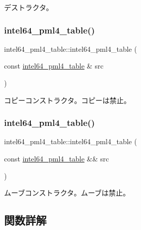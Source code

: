 デストラクタ。 \hypertarget{classintel64__pml4__table_aa6ec87ce70b16782b7aefa3e644bc7d5}{}\label{classintel64__pml4__table_aa6ec87ce70b16782b7aefa3e644bc7d5} 
\subsubsection{\texorpdfstring{intel64\+\_\+pml4\+\_\+table()}{intel64\_pml4\_table()}\hspace{0.1cm}{\footnotesize\ttfamily [2/3]}}
{\footnotesize\ttfamily intel64\+\_\+pml4\+\_\+table\+::intel64\+\_\+pml4\+\_\+table (\begin{DoxyParamCaption}\item[{const \hyperlink{classintel64__pml4__table}{intel64\+\_\+pml4\+\_\+table} \&}]{src }\end{DoxyParamCaption})\hspace{0.3cm}{\ttfamily [delete]}}

コピーコンストラクタ。コピーは禁止。 \hypertarget{classintel64__pml4__table_ac15155f86c99fb627ce4c2201f519eaa}{}\label{classintel64__pml4__table_ac15155f86c99fb627ce4c2201f519eaa} 
\subsubsection{\texorpdfstring{intel64\+\_\+pml4\+\_\+table()}{intel64\_pml4\_table()}\hspace{0.1cm}{\footnotesize\ttfamily [3/3]}}
{\footnotesize\ttfamily intel64\+\_\+pml4\+\_\+table\+::intel64\+\_\+pml4\+\_\+table (\begin{DoxyParamCaption}\item[{const \hyperlink{classintel64__pml4__table}{intel64\+\_\+pml4\+\_\+table} \&\&}]{src }\end{DoxyParamCaption})\hspace{0.3cm}{\ttfamily [delete]}}

ムーブコンストラクタ。ムーブは禁止。 

\subsection{関数詳解}
\hypertarget{classintel64__pml4__table_a8c2591c5781c0db67ad0e44839f9d5a6}{}\label{classintel64__pml4__table_a8c2591c5781c0db67ad0e44839f9d5a6} 
